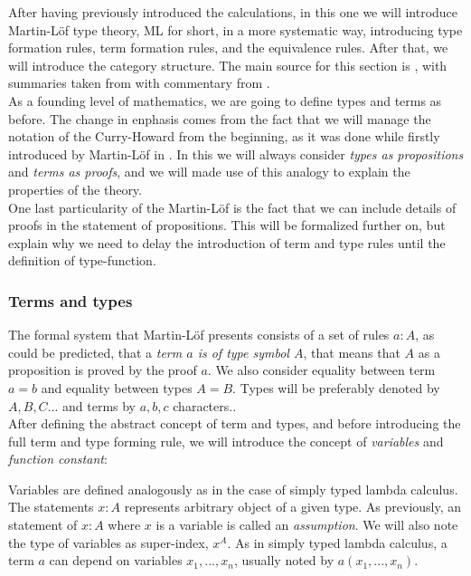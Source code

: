 After having previously introduced the calculations, in this one we will introduce Martin-L\"of type theory, ML for short, in a more systematic way, introducing type formation rules, term formation rules, and the equivalence rules. After that, we will introduce the category structure. The main source for this section is \cite{martinlof1973intuitionistic}, with summaries taken from \cite{seely1984locally} with commentary from .\\

As a founding level of mathematics, we are going to define types and terms as before. The change in enphasis comes from the fact that we will manage the notation of the Curry-Howard from the beginning, as it was done while firstly introduced by Martin-L\"of in \cite{martinlof1973intuitionistic}. In this we will always consider \emph{types as propositions} and \emph{terms as proofs}, and we will made use of this analogy to explain the properties of the theory. \\

One last particularity of the Martin-L\"of is the fact that we can include details of proofs in the statement of propositions. This will be formalized further on, but explain why we need to delay the introduction of term and type rules until the definition of type-function.

\subsubsection{Terms and types}

The formal system that Martin-L\"of presents consists of a set of rules $a : A$, as could be predicted, that a \emph{term $a$ is of type symbol $A$}, that means that $A$ as a proposition is proved by the proof $a$. We also consider equality between term $a = b$ and equality between types $A = B$. Types will be preferably denoted by $A,B,C...$ and terms by $a,b,c$ characters..\\

After defining the abstract concept of term and types, and before introducing the full term and type forming rule, we will introduce the concept of \emph{variables} and \emph{function constant}:

Variables are defined analogously as in the case of simply typed lambda calculus. The statements $x: A$ represents arbitrary object of a given type. As previously, an statement of $x: A$ where $x$ is a variable is called an \emph{assumption}. We will also note the type of variables as super-index, $x^A$. As in simply typed lambda calculus, a term $a$ can depend on variables $x_1,...,x_n$, usually noted by $a(x_1,...,x_n)$.\\

